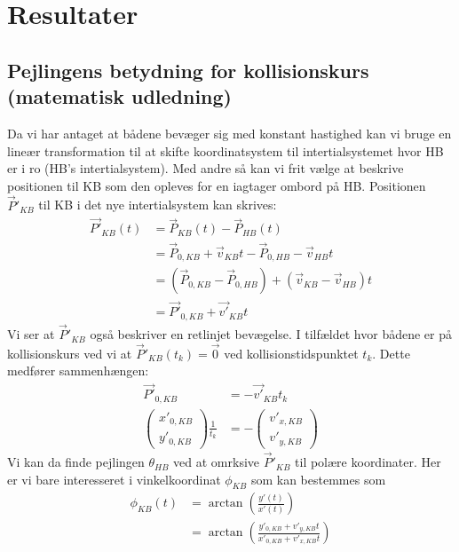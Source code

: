 \documentclass[%
 reprint,
nofootinbib,
aps,
]{revtex4-1}
\begin{document}
\section{Resultater}

\subsection{Pejlingens betydning for kollisionskurs (matematisk udledning)}\label{sec:pejling_betydning}
Da vi har antaget at bådene bevæger sig med konstant hastighed kan vi bruge en lineær transformation til at skifte koordinatsystem til intertialsystemet hvor HB er i ro (HB's intertialsystem). Med andre så kan vi frit vælge at beskrive positionen til KB som den opleves for en iagtager ombord på HB. Positionen $\vec{P}'_{KB}$ til KB i det nye intertialsystem kan skrives:
\begin{align*}
  \vec{P'}_{KB}(t) &= \vec{P}_{KB}(t) - \vec{P}_{HB}(t) \\
  &= \vec{P}_{0,KB} + \vec{v}_{KB}t - \vec{P}_{0,HB} - \vec{v}_{HB}t \\
  &= (\vec{P}_{0,KB} - \vec{P}_{0,HB}) + (\vec{v}_{KB} - \vec{v}_{HB})t \\
  &= \vec{P'}_{0,KB} + \vec{v'}_{KB}t
\end{align*}
Vi ser at $\vec{P}'_{KB}$ også beskriver en retlinjet bevægelse. I tilfældet hvor bådene er på kollisionskurs ved vi at $\vec{P}'_{KB}(t_k) = \vec{0}$ ved kollisionstidspunktet $t_{k}$. Dette medfører sammenhængen:
\begin{align}
  \vec{P'}_{0,KB} &= - \vec{v'}_{KB}t_k \nonumber \\
  \begin{pmatrix} x'_{0,KB} \\ y'_{0,KB} \end{pmatrix}\frac{1}{t_k} &=   -\begin{pmatrix} v'_{x,KB} \\ v'_{y,KB} \end{pmatrix}
  \label{eq:P=v}
\end{align}
Vi kan da finde pejlingen $\theta_{HB}$ ved at omrksive $\vec{P}'_{KB}$ til polære koordinater. Her er vi bare interesseret i vinkelkoordinat $\phi_{KB}$ som kan bestemmes som
\begin{align*}
  \phi_{KB}(t) &= \arctan{\left( \frac{y'(t)}{x'(t)}\right)} \\
  &= \arctan{\left( \frac{y'_{0,KB} + v'_{y,KB}t}{x'_{0,KB} + v'_{x,KB}t}\right)}
\end{align*}
\end{document}
